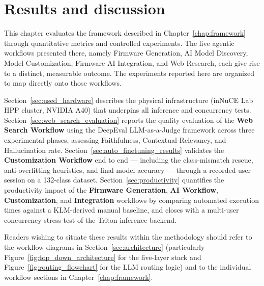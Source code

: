 \chapter{Results and discussion}

This chapter evaluates the framework described in Chapter~\ref{chap:framework} through quantitative metrics and controlled experiments. The five agentic workflows presented there, namely Firmware Generation, AI Model Discovery, Model Customization, Firmware-AI Integration, and Web Research, each give rise to a distinct, measurable outcome. The experiments reported here are organized to map directly onto those workflows.

Section~\ref{sec:used_hardware} describes the physical infrastructure (inNuCE Lab HPP cluster, NVIDIA A40) that underpins all inference and concurrency tests. Section~\ref{sec:web_search_evaluation} reports the quality evaluation of the \textbf{Web Search Workflow} using the DeepEval LLM-as-a-Judge framework across three experimental phases, assessing Faithfulness, Contextual Relevancy, and Hallucination rate. Section~\ref{sec:auto_finetuning_results} validates the \textbf{Customization Workflow} end to end — including the class-mismatch rescue, anti-overfitting heuristics, and final model accuracy — through a recorded user session on a 132-class dataset. Section~\ref{sec:productivity} quantifies the productivity impact of the \textbf{Firmware Generation}, \textbf{AI Workflow}, \textbf{Customization}, and \textbf{Integration} workflows by comparing automated execution times against a KLM-derived manual baseline, and closes with a multi-user concurrency stress test of the Triton inference backend.

Readers wishing to situate these results within the methodology should refer to the workflow diagrams in Section~\ref{sec:architecture} (particularly Figure~\ref{fig:top_down_architecture} for the five-layer stack and Figure~\ref{fig:routing_flowchart} for the LLM routing logic) and to the individual workflow sections in Chapter~\ref{chap:framework}.





